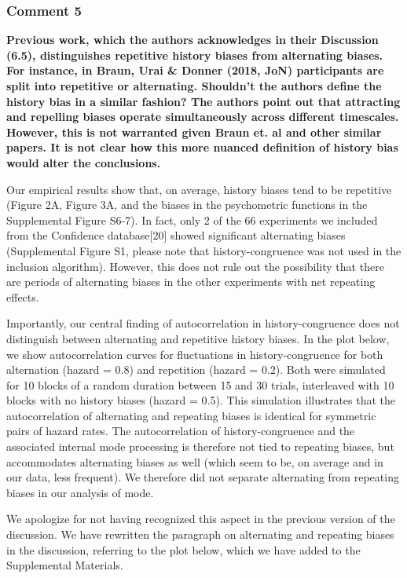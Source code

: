 \documentclass[
]{article}
\begin{document}
\hypertarget{comment-5-1}{%
\subsubsection{Comment 5}\label{comment-5-1}}

\textbf{Previous work, which the authors acknowledges in their
Discussion (6.5), distinguishes repetitive history biases from
alternating biases. For instance, in Braun, Urai \& Donner (2018, JoN)
participants are split into repetitive or alternating. Shouldn't the
authors define the history bias in a similar fashion? The authors point
out that attracting and repelling biases operate simultaneously across
different timescales. However, this is not warranted given Braun et. al
and other similar papers. It is not clear how this more nuanced
definition of history bias would alter the conclusions.}

Our empirical results show that, on average, history biases tend to be
repetitive (Figure 2A, Figure 3A, and the biases in the psychometric
functions in the Supplemental Figure S6-7). In fact, only 2 of the 66
experiments we included from the Confidence database{[}20{]} showed
significant alternating biases (Supplemental Figure S1, please note that
history-congruence was not used in the inclusion algorithm). However,
this does not rule out the possibility that there are periods of
alternating biases in the other experiments with net repeating effects.

Importantly, our central finding of autocorrelation in
history-congruence does not distinguish between alternating and
repetitive history biases. In the plot below, we show autocorrelation
curves for fluctuations in history-congruence for both alternation
(hazard = 0.8) and repetition (hazard = 0.2). Both were simulated for 10
blocks of a random duration between 15 and 30 trials, interleaved with
10 blocks with no history biases (hazard = 0.5). This simulation
illustrates that the autocorrelation of alternating and repeating biases
is identical for symmetric pairs of hazard rates. The autocorrelation of
history-congruence and the associated internal mode processing is
therefore not tied to repeating biases, but accommodates alternating
biases as well (which seem to be, on average and in our data, less
frequent). We therefore did not separate alternating from repeating
biases in our analysis of mode.

We apologize for not having recognized this aspect in the previous
version of the discussion. We have rewritten the paragraph on
alternating and repeating biases in the discussion, referring to the
plot below, which we have added to the Supplemental Materials.
\end{document}
